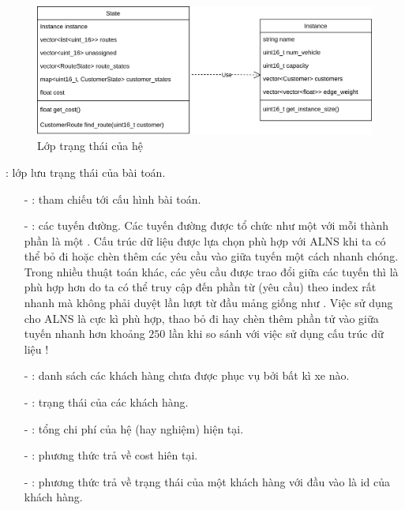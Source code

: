 \begin{figure}[H] %
	\centering %
	\includegraphics[width=1\textwidth]{figures/core-object.png}
	\caption{Lớp trạng thái của hệ}
	\label{fig:fg_04}
\end{figure}

: lớp lưu trạng thái của bài toán.
\begin{itemize}
	\item[-] : tham chiếu tới cấu hình bài toán.
	\item[-] : các tuyến đường. Các tuyến đường được tổ chức như một  với mỗi thành phần là một . Cấu trúc dữ liệu  được lựa chọn phù hợp với ALNS khi ta có thể  bỏ đi hoặc chèn thêm các yêu cầu vào giữa tuyến một cách nhanh chóng. Trong nhiều thuật toán khác, các yêu cầu được trao đổi giữa các tuyến thì  là phù hợp hơn do ta có thể truy cập đến phần từ (yêu cầu) theo index rất nhanh mà không phải duyệt lần lượt từ đầu mảng giống như . Việc sử dụng  cho ALNS là cực kì phù hợp, thao bỏ đi hay chèn thêm phần tử vào giữa tuyến nhanh hơn khoảng $250$ lần khi so sánh với việc sử dụng cấu trúc dữ liệu !
	\item[-] : danh sách các khách hàng chưa được phục vụ bởi bất kì xe nào.
	\item[-] : trạng thái của các khách hàng.
	\item[-] : tổng chi phí của hệ (hay nghiệm) hiện tại.
	\item[-] : phương thức trả về cost hiên tại.
	\item[-] : phương thức trả về trạng thái của một khách hàng với đầu vào là id của khách hàng.
\end{itemize}